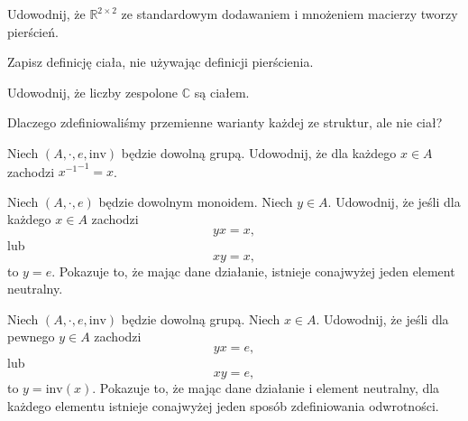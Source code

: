 \begin{exercise}
	Udowodnij,
		że $\mathbb{R}^{2 \times 2}$ ze standardowym dodawaniem i mnożeniem macierzy tworzy pierścień.
\end{exercise}

\begin{exercise}
	Zapisz definicję ciała, nie używając definicji pierścienia.
\end{exercise}

\begin{exercise}
	Udowodnij, że liczby zespolone $\mathbb{C}$ są ciałem.
\end{exercise}

\begin{exercise}
	Dlaczego zdefiniowaliśmy przemienne warianty każdej ze struktur, ale nie ciał?
\end{exercise}

\begin{exercise}
    Niech $(A, \cdot, e, \mathrm{inv})$ będzie dowolną grupą.
    Udowodnij, że dla każdego $x \in A$ zachodzi ${x^{-1}}^{-1} = x$.
\end{exercise}

\begin{exercise}
    Niech $(A, \cdot, e)$ będzie dowolnym monoidem.
	Niech $y \in A$.
    Udowodnij, że jeśli dla każdego $x \in A$ zachodzi
	\begin{equation}
        yx = x,
	\end{equation}
	lub
	\begin{equation}
        xy = x,
	\end{equation}
    to $y = e$.
    Pokazuje to,
		że mając dane działanie,
		istnieje conajwyżej jeden element neutralny.
\end{exercise}

\begin{exercise}
    Niech $(A, \cdot, e, \mathrm{inv})$ będzie dowolną grupą.
	Niech $x \in A$.
    Udowodnij, że jeśli dla pewnego $y \in A$ zachodzi
	\begin{equation}
        yx = e,
	\end{equation}
	lub
	\begin{equation}
        xy = e,
	\end{equation}
    to $y = \mathrm{inv}(x)$.
    Pokazuje to,
		że mając dane działanie i element neutralny,
        dla każdego elementu istnieje conajwyżej jeden sposób zdefiniowania odwrotności.
\end{exercise}

